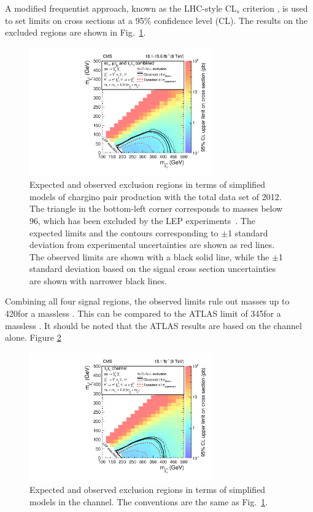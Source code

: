 A modified frequentist approach, known as the LHC-style CL$_s$ criterion \cite{read:CLs,Junk:1999kv,ATLAS:2011tau}, is used to 
set limits on cross sections at a 95\% confidence level (CL).
The results on the excluded regions are shown in Fig.~\ref{fig:limit_final}. 
\begin{linenomath}
\begin{figure}[!htb]
\centering
\includegraphics[width=0.7\textwidth,keepaspectratio=true]{StatisticsFig/Exclusion4Bins.pdf}
\caption{Expected and observed exclusion regions in terms of simplified models of
chargino pair production with the total data set of 2012. 
The triangle in the bottom-left corner corresponds to  \sTau masses below 96\GeV, which has been excluded by the LEP experiments~\cite{lepsusy}.
The expected limits and the contours corresponding to $\pm$1 standard deviation from experimental uncertainties are shown as red lines. 
The observed limits are shown with a black solid line, while the $\pm$1 standard deviation based on the signal cross section uncertainties 
are shown with narrower black lines.}
\label{fig:limit_final}
\end{figure}
\end{linenomath}
Combining all four signal regions,
the observed limits rule out \chione  masses up to  420\GeV  for a massless \PSGczDo.  
This can be compared to the ATLAS limit of 345\GeV for a massless \PSGczDo \cite{Aad:2014yka}.
It should be noted that the ATLAS results are based on the \tauTau channel alone. Figure 
\ref{fig:limit_tauTau} 
\begin{linenomath}
\begin{figure}[!htb]
\centering
\includegraphics[width=0.7\textwidth,keepaspectratio=true]{StatisticsFig/ExclusionTauTau2Bin.pdf}
\caption{Expected and observed exclusion regions in terms of simplified models
in the \tauTau channel. The conventions are the same as Fig.~\ref{fig:limit_final}.}
\label{fig:limit_tauTau}
\end{figure}
\end{linenomath}
